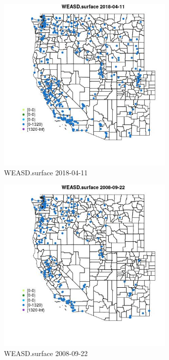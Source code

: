 \begin{figure} 
\centering  
\includegraphics[width=0.77\textwidth]{Code_Outputs/Report_ML_input_PM25_Step4_part_e_de_duplicated_aves_compiled_2019-05-18wNAs_MapObsWEASDsurface2018-04-11.jpg} 
\caption{\label{fig:Report_ML_input_PM25_Step4_part_e_de_duplicated_aves_compiled_2019-05-18wNAsMapObsWEASDsurface2018-04-11}WEASD.surface 2018-04-11} 
\end{figure} 
 

\clearpage 

\begin{figure} 
\centering  
\includegraphics[width=0.77\textwidth]{Code_Outputs/Report_ML_input_PM25_Step4_part_e_de_duplicated_aves_compiled_2019-05-18wNAs_MapObsWEASDsurface2008-09-22.jpg} 
\caption{\label{fig:Report_ML_input_PM25_Step4_part_e_de_duplicated_aves_compiled_2019-05-18wNAsMapObsWEASDsurface2008-09-22}WEASD.surface 2008-09-22} 
\end{figure} 
 

